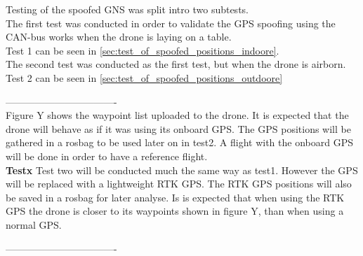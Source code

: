 Testing of the spoofed GNS was split intro two subtests. \\
The first test was conducted in order to validate the GPS spoofing using the CAN-bus works when the drone is laying on a table. \\
Test 1 can be seen in \ref{sec:test_of_spoofed_positions_indoore}.\\
The second test was conducted as the first test, but when the drone is airborn.\\
Test 2 can be seen in \ref{sec:test_of_spoofed_positions_outdoore}



----------------------------------\\
Figure Y shows the waypoint list uploaded to the drone. It is expected that the drone will behave as if it was using its onboard GPS.
The GPS positions will be gathered in a rosbag to be used later on in test2.
A flight with the onboard GPS will be done in order to have a reference flight.\\
\textbf{Testx}
Test two will be conducted much the same way as test1. However the GPS will be replaced with a lightweight RTK GPS. The RTK GPS positions will also be saved in a rosbag for later analyse. Is is expected that when using the RTK GPS the drone is closer to its waypoints  shown in figure Y, than when using a normal GPS.

----------------------------------\\




